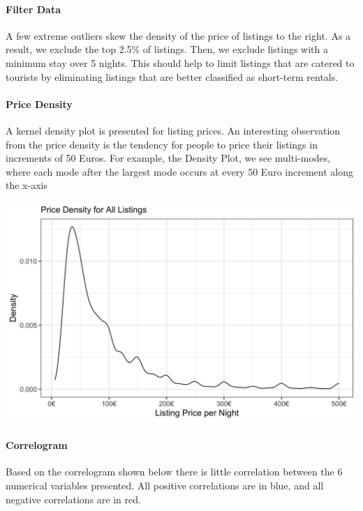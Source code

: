 \documentclass[]{article}
\let\oldparagraph\paragraph
\renewcommand{\paragraph}[1]{\oldparagraph{#1}\mbox{}}
\begin{document}
\hypertarget{filter-data}{%
\paragraph{Filter Data}\label{filter-data}}

A few extreme outliers skew the density of the price of listings to the
right. As a result, we exclude the top 2.5\% of listings. Then, we
exclude listings with a minimum stay over 5 nights. This should help to
limit listings that are catered to tourists by eliminating listings that
are better classified as short-term rentals.

\hypertarget{price-density}{%
\paragraph{Price Density}\label{price-density}}

A kernel density plot is presented for listing prices. An interesting
observation from the price density is the tendency for people to price
their listings in increments of 50 Euros. For example, the Density Plot,
we see multi-modes, where each mode after the largest mode occurs at
every 50 Euro increment along the x-axis

\includegraphics[width=6.77083in,height=\textheight]{../images/density_plot.png}

\hypertarget{correlogram}{%
\paragraph{Correlogram}\label{correlogram}}

Based on the correlogram shown below there is little correlation between
the 6 numerical variables presented. All positive correlations are in
blue, and all negative correlations are in red.
\end{document}
